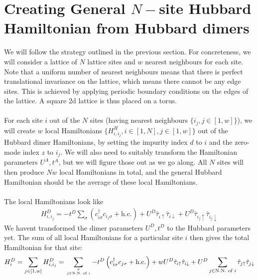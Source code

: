 \documentclass[12pt]{article}
\numberwithin{equation}{section}
\begin{document}
\section{Creating General \(N-\)site Hubbard Hamiltonian from Hubbard dimers}
We will follow the strategy outlined in the previous section. For concreteness, we will consider a lattice of \(N\) lattice sites and \(w\) nearest neighbours for each site. Note that a uniform number of nearest neighbours means that there is perfect translational invariance on the lattice, which means there cannot be any edge sites. This is achieved by applying periodic boundary conditions on the edges of the lattice. A square 2d lattice is thus placed on a torus.
\\\\
For each site \(i\) out of the \(N\) sites (having nearest neighbours \(\{i_j, j\in\left[1,w\right]\}\)), we will create \(w\) local Hamiltonians \(\{H^H_{i,i_j}, i\in \left[1,N\right], j \in \left[1,w\right]  \}\) out of the Hubbard dimer Hamiltonians, by setting the impurity index \(d\) to \(i\) and the zero-mode index \(z\) to \(i_j\). We will also need to suitably transform the Hamiltonian parameters \(U^A, t^A\), but we will figure those out as we go along. All \(N\) sites will then produce \(Nw\) local Hamiltonians in total, and the general Hubbard Hamiltonian should be the average of these local Hamiltonians. 
\\\\
The local Hamiltonians look like
\begin{equation}\begin{aligned}
	H^D_{i,i_j} = -t^D\sum_{\sigma}\left(c^\dagger_{i\sigma}c_{i_j\sigma} + \text{h.c.}\right) + U^D\hat \tau_{i \uparrow}\hat \tau_{i \downarrow} + U^D\hat \tau_{i_j \uparrow}\hat \tau_{i_j \downarrow}
\end{aligned}\end{equation}
We havent transformed the dimer parameters \(U^D, t^D\) to the Hubbard parameters yet. The sum of all local Hamiltonians for a particular site \(i\) then gives the total Hamiltonian for that site:
\begin{equation}\begin{aligned}
	H^D_{i} = \sum_{j\in\left[1,w\right]}H^D_{i,i_j} = \sum_{\sigma\atop{j \in \text{N.N. of }i}}-t^D\left(c^\dagger_{i\sigma}c_{j\sigma} + \text{h.c.}\right) + w U^D\hat \tau_{i \uparrow}\hat \tau_{i \downarrow} + U^D\sum_{j \in \text{N.N. of }i}\hat \tau_{j \uparrow}\hat \tau_{j \downarrow}
\end{aligned}\end{equation}
\end{document}

